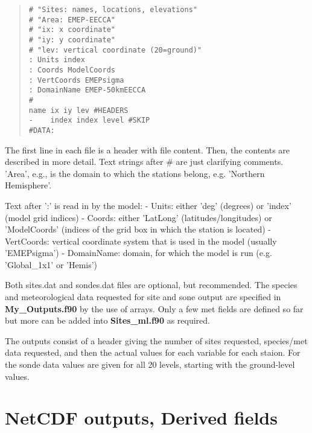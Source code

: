\begin{small}
\begin{quote}
\begin{verbatim}
# "Sites: names, locations, elevations"
# "Area: EMEP-EECCA"
# "ix: x coordinate"
# "iy: y coordinate"
# "lev: vertical coordinate (20=ground)"
: Units index
: Coords ModelCoords
: VertCoords EMEPsigma
: DomainName EMEP-50kmEECCA
#
name ix iy lev #HEADERS
-    index index level #SKIP
#DATA:
\end{verbatim}

\end{quote}
\end{small}

The first line in each file is a header with file content.
Then, the contents are described in more detail. Text strings after
\# are just clarifying comments. 'Area', e.g., is the domain to which
the stations belong, e.g. 'Northern Hemisphere'.

Text after ':' is read in by the model:\newline
- Units: either 'deg' (degrees) or 'index' (model grid indices)\newline
- Coords: either 'LatLong' (latitudes/longitudes) or 'ModelCoords'
(indices of the grid box in which the station is located)\newline
- VertCoords: vertical coordinate system that is used in the model (usually
'EMEPsigma')\newline
- DomainName: domain, for which the model is run (e.g. 'Global\_1x1' or 'Hemis')\newline


Both sites.dat and sondes.dat files are optional, but recommended. 
The species and meteorological data requested for site and sone output
 are specified in {\bf My\_Outputs.f90} by the use of arrays. Only a 
few met fields are defined so far but more can be added into 
{\bf Sites\_ml.f90} as required. 

The outputs consist of a header giving the number of sites requested, 
species/met data requested, and then the actual values for each 
variable for each staion. For the sonde data values are given for 
all 20 levels, starting with the ground-level values.


\newpage

\section{NetCDF outputs, Derived fields}

